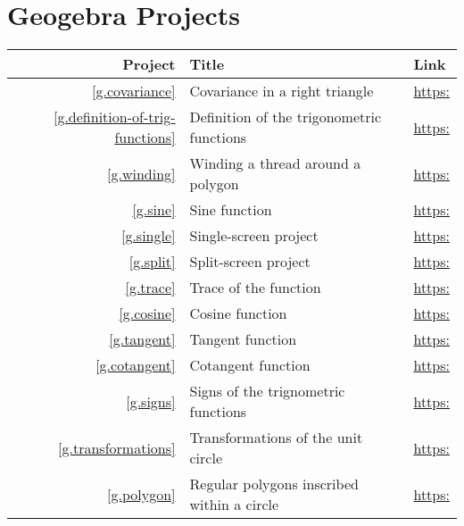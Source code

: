 
\appendix
\chapter{Geogebra Projects}\label{a.geogebra}

\begin{center}
\begin{tabular}{|r|p{7cm}|p{6cm}|}
\hline
Project & Title & Link\\
\hline
\ref{g.covariance} & Covariance in a right triangle & 
  \url{https:}\\\hline

\ref{g.definition-of-trig-functions} & Definition of the trigonometric functions & 
  \url{https:}\\\hline

\ref{g.winding} & Winding a thread around a polygon &
  \url{https:}\\\hline

\ref{g.sine} & Sine function & 
  \url{https:}\\\hline

\ref{g.single} & Single-screen project & 
  \url{https:}\\\hline

\ref{g.split} & Split-screen project & 
  \url{https:}\\\hline

\ref{g.trace} & Trace of the function & 
  \url{https:}\\\hline

\ref{g.cosine} & Cosine function & 
  \url{https:}\\\hline

\ref{g.tangent} & Tangent function & 
  \url{https:}\\\hline

\ref{g.cotangent} & Cotangent function &
  \url{https:}\\\hline

\ref{g.signs} & Signs of the trignometric functions &
  \url{https:}\\\hline

\ref{g.transformations} & Transformations of the unit circle &
  \url{https:}\\\hline

\ref{g.polygon} & Regular polygons inscribed within a circle & 
  \url{https:}\\\hline
\end{tabular}
\end{center}
